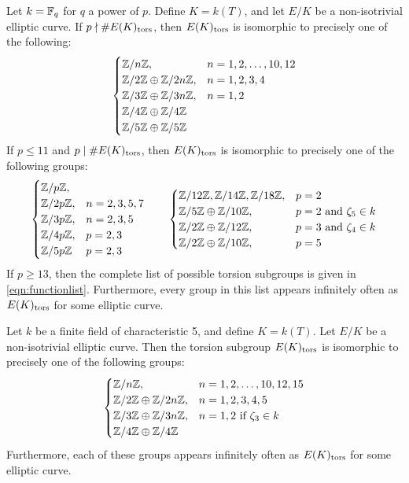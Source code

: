 \begin{thm}
Let $k= \mathbb{F}_q$ for $q$ a power of $p$. Define $K= k(T)$, and let $E/K$ be a non-isotrivial elliptic curve. If $p \nmid \#E(K)_{\text{tors}}$, then $E(K)_{\text{tors}}$ is isomorphic to precisely one of the following: 
		\begin{equation} \label{eqn:functionlist}
		\begin{cases}
		\mathbb{Z}/n\mathbb{Z}, & n= 1, 2, \ldots, 10, 12 \\
		\mathbb{Z}/2\mathbb{Z} \oplus \mathbb{Z}/2n\mathbb{Z}, & n= 1, 2, 3, 4 \\
		\mathbb{Z}/3\mathbb{Z} \oplus \mathbb{Z}/3n\mathbb{Z}, & n= 1, 2 \\
		\mathbb{Z}/4\mathbb{Z} \oplus \mathbb{Z}/4\mathbb{Z} \\
		\mathbb{Z}/5\mathbb{Z} \oplus \mathbb{Z}/5\mathbb{Z}
		\end{cases}
		\end{equation}
If $p \leq 11$ and $p \mid \#E(K)_{\text{tors}}$, then $E(K)_{\text{tors}}$ is isomorphic to precisely one of the following groups:
		\[
		\begin{cases}
		\mathbb{Z}/p\mathbb{Z}, \\
		\mathbb{Z}/2p\mathbb{Z}, & n= 2, 3, 5, 7 \\
		\mathbb{Z}/3p\mathbb{Z}, & n= 2, 3, 5 \\
		\mathbb{Z}/4p\mathbb{Z}, & p= 2, 3 \\
		\mathbb{Z}/5p\mathbb{Z} & p= 2, 3 
		\end{cases} \quad\quad
		\begin{cases}
		\mathbb{Z}/12\mathbb{Z}, \mathbb{Z}/14\mathbb{Z}, \mathbb{Z}/18\mathbb{Z}, & p= 2 \\
		\mathbb{Z}/5\mathbb{Z} \oplus \mathbb{Z}/10\mathbb{Z}, & p= 2 \text{ and } \zeta_5 \in k \\
		\mathbb{Z}/2\mathbb{Z} \oplus \mathbb{Z}/12\mathbb{Z}, & p= 3 \text{ and } \zeta_4 \in k \\
		\mathbb{Z}/2\mathbb{Z} \oplus \mathbb{Z}/10\mathbb{Z}, & p= 5
		\end{cases}
		\]
If $p \geq 13$, then the complete list of possible torsion subgroups is given in \eqref{eqn:functionlist}. Furthermore, every group in this list appears infinitely often as $E(K)_{\text{tors}}$ for some elliptic curve. 
\end{thm}


\begin{thm}
Let $k$ be a finite field of characteristic 5, and define $K= k(T)$. Let $E/K$ be a non-isotrivial elliptic curve. Then the torsion subgroup $E(K)_{\text{tors}}$ is isomorphic to precisely one of the following groups:
	\[
	\begin{cases}
	\mathbb{Z}/n\mathbb{Z}, & n= 1, 2, \ldots, 10, 12, 15 \\
	\mathbb{Z}/2\mathbb{Z} \oplus \mathbb{Z}/2n\mathbb{Z}, & n= 1, 2, 3, 4, 5 \\
	\mathbb{Z}/3\mathbb{Z} \oplus \mathbb{Z}/3n\mathbb{Z}, & n= 1, 2 \text{ if } \zeta_3 \in k \\
	\mathbb{Z}/4\mathbb{Z} \oplus \mathbb{Z}/4\mathbb{Z}
	\end{cases}
	\]
Furthermore, each of these groups appears infinitely often as $E(K)_{\text{tors}}$ for some elliptic curve. 
\end{thm}



